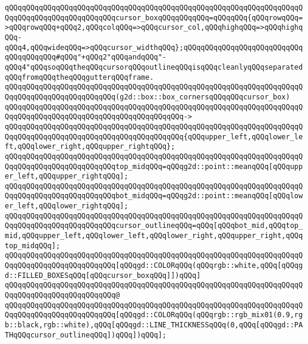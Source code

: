 \newline
\verb|qQQqqQQqqQQqqQQqqQQqqQQqqQQqqQQqqQQqqQQqqQQqqQQqqQQqqQQqqQQqqQQqqQQqqQQqqQQqqQQqqQQqqQQqqQQqqQQqcursor_boxqQQqqQQqqQQq=qQQqqQQq{qQQqrowqQQq=>qQQqrowqQQq+qQQq2,qQQqcolqQQq=>qQQqcursor_col,qQQqhighqQQq=>qQQqhighqQQq-qQQq4,qQQqwideqQQq=>qQQqcursor_widthqQQq};qQQqqQQqqQQqqQQqqQQqqQQqqQQqqQQqqQQqqQQq#qQQq"+qQQq2"qQQqandqQQq"-qQQq4"qQQqsoqQQqtheqQQqcursorqQQqoutlineqQQqisqQQqcleanlyqQQqseparatedqQQqfromqQQqtheqQQqgutterqQQqframe.|\newline
\newline
\verb|qQQqqQQqqQQqqQQqqQQqqQQqqQQqqQQqqQQqqQQqqQQqqQQqqQQqqQQqqQQqqQQqqQQqqQQqqQQqqQQqqQQqqQQqqQQqqQQq(g2d::box::box_cornersqQQqqQQqcursor_box)|\newline
\verb|qQQqqQQqqQQqqQQqqQQqqQQqqQQqqQQqqQQqqQQqqQQqqQQqqQQqqQQqqQQqqQQqqQQqqQQqqQQqqQQqqQQqqQQqqQQqqQQqqQQqqQQqqQQqqQQq->|\newline
\verb|qQQqqQQqqQQqqQQqqQQqqQQqqQQqqQQqqQQqqQQqqQQqqQQqqQQqqQQqqQQqqQQqqQQqqQQqqQQqqQQqqQQqqQQqqQQqqQQqqQQqqQQqqQQqqQQq{qQQqupper_left,qQQqlower_left,qQQqlower_right,qQQqupper_rightqQQq};|\newline
\newline
\verb|qQQqqQQqqQQqqQQqqQQqqQQqqQQqqQQqqQQqqQQqqQQqqQQqqQQqqQQqqQQqqQQqqQQqqQQqqQQqqQQqqQQqqQQqqQQqqQQqtop_midqQQq=qQQqg2d::point::meanqQQq[qQQqupper_left,qQQqupper_rightqQQq];|\newline
\verb|qQQqqQQqqQQqqQQqqQQqqQQqqQQqqQQqqQQqqQQqqQQqqQQqqQQqqQQqqQQqqQQqqQQqqQQqqQQqqQQqqQQqqQQqqQQqqQQqbot_midqQQq=qQQqg2d::point::meanqQQq[qQQqlower_left,qQQqlower_rightqQQq];|\newline
\newline
\verb|qQQqqQQqqQQqqQQqqQQqqQQqqQQqqQQqqQQqqQQqqQQqqQQqqQQqqQQqqQQqqQQqqQQqqQQqqQQqqQQqqQQqqQQqqQQqqQQqcursor_outlineqQQq=qQQq[qQQqbot_mid,qQQqtop_mid,qQQqupper_left,qQQqlower_left,qQQqlower_right,qQQqupper_right,qQQqtop_midqQQq];|\newline
\newline
\verb|qQQqqQQqqQQqqQQqqQQqqQQqqQQqqQQqqQQqqQQqqQQqqQQqqQQqqQQqqQQqqQQqqQQqqQQqqQQqqQQqqQQqqQQqqQQqqQQq[qQQqgd::COLORqQQq(qQQqrgb::white,qQQq[qQQqgd::FILLED_BOXESqQQq[qQQqcursor_boxqQQq]])qQQq]|\newline
\verb|qQQqqQQqqQQqqQQqqQQqqQQqqQQqqQQqqQQqqQQqqQQqqQQqqQQqqQQqqQQqqQQqqQQqqQQqqQQqqQQqqQQqqQQqqQQqqQQq@|\newline
\verb|qQQqqQQqqQQqqQQqqQQqqQQqqQQqqQQqqQQqqQQqqQQqqQQqqQQqqQQqqQQqqQQqqQQqqQQqqQQqqQQqqQQqqQQqqQQqqQQq[qQQqgd::COLORqQQq(qQQqrgb::rgb_mix01(0.9,rgb::black,rgb::white),qQQq[qQQqgd::LINE_THICKNESSqQQq(0,qQQq[qQQqgd::PATHqQQqcursor_outlineqQQq])qQQq])qQQq];|\newline
